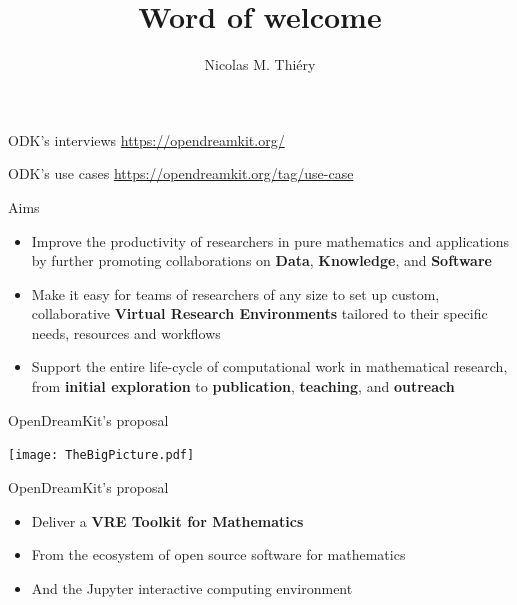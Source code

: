 \documentclass{beamer}
\author{Nicolas M. Thiéry}
\title{Word of welcome}
\begin{document}
\begin{frame}
  \titlepage
\end{frame}

\begin{frame}{ODK's interviews}
  \url{https://opendreamkit.org/}
\end{frame}

\begin{frame}{ODK's use cases}
  \url{https://opendreamkit.org/tag/use-case}
\end{frame}

\begin{frame}{Aims}
  \begin{itemize}
  \item Improve the productivity of researchers in pure mathematics and
    applications by further promoting collaborations on \textbf{Data},
    \textbf{Knowledge}, and \textbf{Software}
  \item Make it easy for teams of researchers of any size to set up
    custom, collaborative \textbf{Virtual Research Environments}
    tailored to their specific needs, resources and workflows
  \item Support the entire life-cycle of computational work in
    mathematical research, from \textbf{initial exploration} to
    \textbf{publication}, \textbf{teaching}, and \textbf{outreach}
  \end{itemize}
\end{frame}


\begin{frame}{OpenDreamKit's proposal}\label{our-proposal}
  \centerline{\texttt{[image: TheBigPicture.pdf]}}
\end{frame}

\begin{frame}{OpenDreamKit's proposal}\label{our-proposal}
  \begin{itemize}
  \item Deliver a \textbf{VRE Toolkit for Mathematics}
  \item From the ecosystem of open source software for mathematics
  \item And the Jupyter interactive computing environment
  \end{itemize}
\end{frame}
\end{document}
